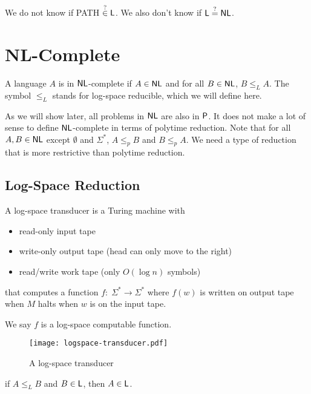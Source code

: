 We do not know if PATH $\overset{?}{\in} \mathsf{L}$. We also don't know if $\mathsf{L} \overset{?}{=} \mathsf{NL}$.

\section{NL-Complete}

A language $A$ is in $\mathsf{NL}$-complete if $A \in \mathsf{NL}$ and for all $B \in \mathsf{NL}$, $B \leq_L A$. The symbol $\leq_L$ stands for log-space reducible, which we will define here.

As we will show later, all problems in $\mathsf{NL}$ are also in $\mathsf{P}$. It does not make a lot of sense to define $\mathsf{NL}$-complete in terms of polytime reduction. Note that for all $A,B \in \mathsf{NL}$ except $\emptyset$ and $\Sigma^*$, $A \leq_p B$ and $B \leq_p A$. We need a type of reduction that is more restrictive than polytime reduction.

\subsection{Log-Space Reduction}

A log-space transducer is a Turing machine with
\begin{itemize}
    \item read-only input tape
    \item write-only output tape (head can only move to the right)
    \item read/write work tape (only $O(\log n)$ symbols)
\end{itemize}
that computes a function $f:\; \Sigma^* \to \Sigma^*$ where $f(w)$ is written on output tape when $M$ halts when $w$ is on the input tape.

We say $f$ is a log-space computable function.

\begin{figure}[htbp]
    \centering
    \texttt{[image: logspace-transducer.pdf]}
    \caption{A log-space transducer}
    \label{fig:logspace-transducer}
\end{figure}

\begin{theorem}
    if $A \leq_L B$ and $B \in \mathsf{L}$, then $A \in \mathsf{L}$.
\end{theorem}

